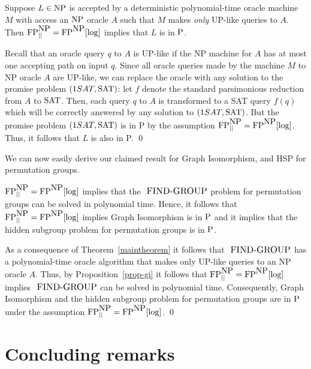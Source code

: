 \documentclass{elsart}
\newcommand{\p}{\mbox{\rm P}}
\newcommand{\NP}{\mbox{\rm NP}}
\newcommand{\FP}{\mbox{\rm FP}}
\newcommand{\FINDGROUP}{\mbox{\small\rm FIND{-}GROUP}}
\newcommand{\SAT}{\mbox{\rm SAT}}
\newcommand{\oneSAT}{\ensuremath{\rm 1SAT}}
\begin{document}
\begin{prop}\label{prop-gi}
  Suppose $L\in\NP$ is accepted by a deterministic polynomial-time
  oracle machine $M$ with access an $\NP$ oracle $A$ such that $M$
  makes \emph{only} UP-like queries to $A$. Then
  $\FP^{\NP}_{||}=\FP^{\NP}[\log]$ implies that $L$ is in $\p$.
\end{prop}

\begin{pf}
  Recall that an oracle query $q$ to $A$ is UP-like if the NP machine
  for $A$ has at most one accepting path on input $q$. Since all
  oracle queries made by the machine $M$ to NP oracle $A$ are UP-like,
  we can replace the oracle with any solution to the promise problem
  $(\oneSAT,\SAT)$: let $f$ denote the standard parsimonious reduction
  from $A$ to $\SAT$. Then, each query $q$ to $A$ is transformed to a
  SAT query $f(q)$ which will be correctly answered by any solution to
  $(\oneSAT,\SAT)$. But the promise problem $(\oneSAT,\SAT)$ is in P
  by the assumption $\FP^{\NP}_{||}=\FP^{\NP}[\log]$. Thus, it follows
  that $L$ is also in P. \qed 
\end{pf}

We can now easily derive our claimed result for Graph Isomorphism, and
HSP for permutation groups.

\begin{thm}
  $\FP^{\NP}_{||}=\FP^{\NP}[\log]$ implies that the $\FINDGROUP$
  problem for permutation groups can be solved in polynomial time.
  Hence, it follows that $\FP^{\NP}_{||}=\FP^{\NP}[\log]$ implies
  Graph Isomorphism is in $\p$ and it implies that the hidden subgroup
  problem for permutation groups is in $\p$.
\end{thm}

\begin{pf}
  As a consequence of Theorem~\ref{maintheorem} it follows that
  $\FINDGROUP$ has a polynomial-time oracle algorithm that makes only
  UP-like queries to an NP oracle $A$. Thus, by
  Proposition~\ref{prop-gi} it follows that
  $\FP^{\NP}_{||}=\FP^{\NP}[\log]$ implies $\FINDGROUP$ can be solved
  in polynomial time. Consequently, Graph Isomorphism and the hidden
  subgroup problem for permutation groups are in $\p$ under the
  assumption $\FP^{\NP}_{||}=\FP^{\NP}[\log]$. \qed
\end{pf}

\section{Concluding remarks}
\end{document}
